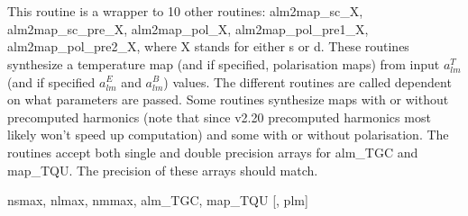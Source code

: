 
\sloppy


\section[alm2map*]{ }
\label{sub:alm2map}
\author{Eric Hivon, Frode K.~Hansen}

\begin{facility}
{This routine is a wrapper to 10 other routines: alm2map\_sc\_X,
  alm2map\_sc\_pre\_X, alm2map\_pol\_X, alm2map\_pol\_pre1\_X,
  alm2map\_pol\_pre2\_X, where X stands for either s or d. These routines
  synthesize a  temperature map (and if specified, polarisation maps) 
from input $a_{lm}^T$ (and if specified $a_{lm}^E$ and $a_{lm}^B$) values. 
The different routines are called dependent on what parameters are passed. 
Some routines synthesize maps with or without precomputed harmonics (note that
since \healpix v2.20 precomputed harmonics most likely won't speed up computation)
and some with or without polarisation.
The routines accept both single and double precision arrays for alm\_TGC and
  map\_TQU. The precision of these arrays should match.}
{\modAlmTools}
\end{facility}

\begin{f90format}
{nsmax, nlmax, nmmax, alm\_TGC, map\_TQU [, plm]}
\end{f90format}

